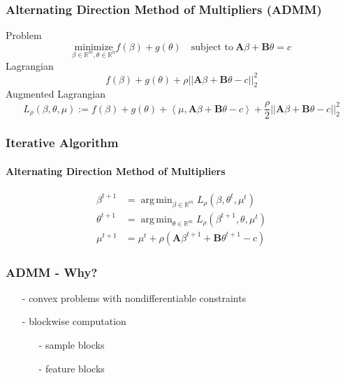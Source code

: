 \documentclass{beamer}
\newcommand{\R}{\mathbb{R}}
\DeclareMathOperator*{\argmin}{arg\,min}
\begin{document}
\begin{frame}
\frametitle{Alternating Direction Method of Multipliers (ADMM)}
Problem 
\[\underset{\beta\in\R^m, \theta\in\R^n}{\text{minimize}}f(\beta)+g(\theta)\quad\text{subject to}\ \mathbf{A}\beta+\mathbf{B}\theta=c\]
Lagrangian 
\[f(\beta)+g(\theta)+\rho||\mathbf{A}\beta+\mathbf{B}\theta-c||_2^2\]
Augmented Lagrangian
\[L_{\rho}(\beta,\theta,\mu):=f(\beta)+g(\theta)+\left\langle\mu,\mathbf{A}\beta+\mathbf{B}\theta-c\right\rangle+\frac{\rho}{2}||\mathbf{A}\beta+\mathbf{B}\theta-c||_2^2\]
\end{frame}


\begin{frame}
\frametitle{Iterative Algorithm}
\framesubtitle{Alternating Direction Method of Multipliers}
\begin{align*}
\beta^{t+1}&=\argmin_{\beta\in\R^m}L_{\rho}(\beta,\theta^t,\mu^t)\\
\theta^{t+1}&=\argmin_{\theta\in\R^m}L_{\rho}(\beta^{t+1},\theta,\mu^t)\\
\mu^{t+1}&=\mu^t+\rho(\mathbf{A}\beta^{t+1}+\mathbf{B}\theta^{t+1}-c)
\end{align*}
\end{frame}


\begin{frame}
\frametitle{ADMM - Why?}
\begin{itemize}
\item[-] convex problems with nondifferentiable constraints
\item[-] blockwise computation
	\begin{itemize}
	\item[-] sample blocks
	\item[-] feature blocks
	\end{itemize}
\end{itemize}
\end{frame}

\end{document}
